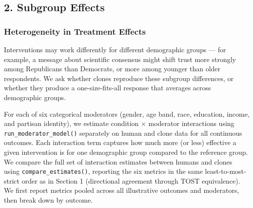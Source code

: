 \documentclass[
  letterpaper,
  DIV=11,
  numbers=noendperiod]{scrartcl}
\begin{document}
\subsection{2. Subgroup Effects}\label{subgroup-effects}

\subsubsection{Heterogeneity in Treatment
Effects}\label{heterogeneity-in-treatment-effects}

Interventions may work differently for different demographic groups ---
for example, a message about scientific consensus might shift trust more
strongly among Republicans than Democrats, or more among younger than
older respondents. We ask whether clones reproduce these subgroup
differences, or whether they produce a one-size-fits-all response that
averages across demographic groups.

For each of six categorical moderators (gender, age band, race,
education, income, and partisan identity), we estimate condition ×
moderator interactions using \texttt{run\_moderator\_model()} separately
on human and clone data for all continuous outcomes. Each interaction
term captures how much more (or less) effective a given intervention is
for one demographic group compared to the reference group. We compare
the full set of interaction estimates between humans and clones using
\texttt{compare\_estimates()}, reporting the six metrics in the same
least-to-most-strict order as in Section 1 (directional agreement
through TOST equivalence). We first report metrics pooled across all
illustrative outcomes and moderators, then break down by outcome.
\end{document}
